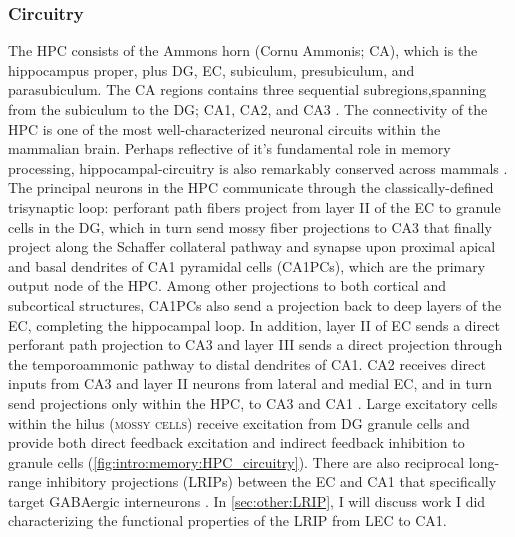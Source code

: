 \subsubsection{Circuitry}
The \ac{HPC} consists of the Ammons horn (Cornu Ammonis; CA), which is the hippocampus proper, plus \ac{DG}, \ac{EC}, subiculum, presubiculum, and parasubiculum.
The CA regions contains three sequential subregions,spanning from the subiculum to the \ac{DG}; CA1, CA2, and CA3 \citep{deNo1934}.
The connectivity of the \ac{HPC} is one of the most well-characterized neuronal circuits within the mammalian brain.
Perhaps reflective of it's fundamental role in memory processing, hippocampal-circuitry is also remarkably conserved across mammals \citep{Manns2006}.
The principal neurons in the \ac{HPC} communicate through the classically-defined trisynaptic loop: perforant path fibers project from layer II of the \ac{EC} to granule cells in the \ac{DG}, which in turn send mossy fiber projections to CA3 that finally project along the Schaffer collateral pathway and synapse upon proximal apical and basal dendrites of CA1 pyramidal cells (CA1PCs), which are the primary output node of the \ac{HPC}.
Among other projections to both cortical and subcortical structures, CA1PCs also send a projection back to deep layers of the \ac{EC}, completing the hippocampal loop.
In addition, layer II of \ac{EC} sends a direct perforant path projection to CA3 and layer III sends a direct projection through the temporoammonic pathway to distal dendrites of CA1.
CA2 receives direct inputs from CA3 and layer II neurons from lateral and medial \ac{EC}, and in turn send projections only within the \ac{HPC}, to CA3 and CA1 \citep{Hitti2014}. 
Large excitatory cells within the hilus (\textsc{mossy cells}) receive excitation from \ac{DG} granule cells and provide both direct feedback excitation and indirect feedback inhibition to granule cells (\autoref{fig:intro:memory:HPC_circuitry}).
There are also reciprocal long-range inhibitory projections (LRIPs) between the \ac{EC} and CA1 that specifically target GABAergic interneurons \citep{Melzer2012, Basu2016}.
In \autoref{sec:other:LRIP}, I will discuss work I did characterizing the functional properties of the LRIP from LEC to CA1. 
